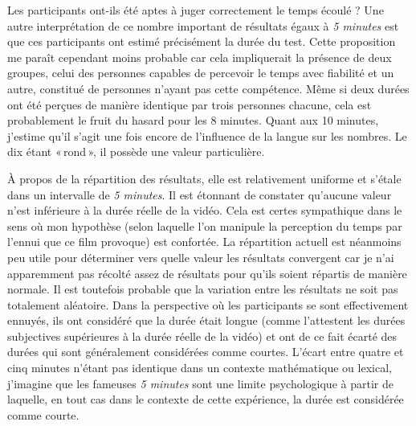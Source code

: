 \documentclass[12pt,fleqn,oneside,french,openany]{book} %
\begin{document}
Les participants ont-ils été aptes à juger correctement le temps écoulé ? Une autre interprétation de ce nombre important de résultats égaux à \emph{5 minutes} est que ces participants ont estimé précisément la durée du test. Cette proposition me paraît cependant moins probable car cela impliquerait la présence de deux groupes, celui des personnes capables de percevoir le temps avec fiabilité et un autre, constitué de personnes n'ayant pas cette compétence. Même si deux durées ont été perçues de manière identique par trois personnes chacune, cela est probablement le fruit du hasard pour les 8 minutes. Quant aux 10 minutes, j'estime qu'il s'agit une fois encore de l'influence de la langue sur les nombres. Le dix étant «\,rond\,», il possède une valeur particulière.

À propos de la répartition des résultats, elle est relativement uniforme et s'étale dans un intervalle de \emph{5 minutes}. Il est étonnant de constater qu'aucune valeur n'est inférieure à la durée réelle de la vidéo. Cela est certes sympathique dans le sens où mon hypothèse (selon laquelle l'on manipule la perception du temps par l'ennui que ce film provoque) est confortée. La répartition actuell est néanmoins peu utile pour déterminer vers quelle valeur les résultats convergent car je n'ai apparemment pas récolté assez de résultats pour qu'ils soient répartis de manière normale. Il est toutefois probable que la variation entre les résultats ne soit pas totalement aléatoire. Dans la perspective où les participants se sont effectivement ennuyés, ils ont considéré que la durée était longue (comme l'attestent les durées subjectives supérieures à la durée réelle de la vidéo) et ont de ce fait écarté des durées qui sont généralement considérées comme courtes. L'écart entre quatre et cinq minutes n'étant pas identique dans un contexte mathématique ou lexical, j'imagine que les fameuses \emph{5 minutes} sont une limite psychologique à partir de laquelle, en tout cas dans le contexte de cette expérience, la durée est considérée comme courte. 
\end{document}
